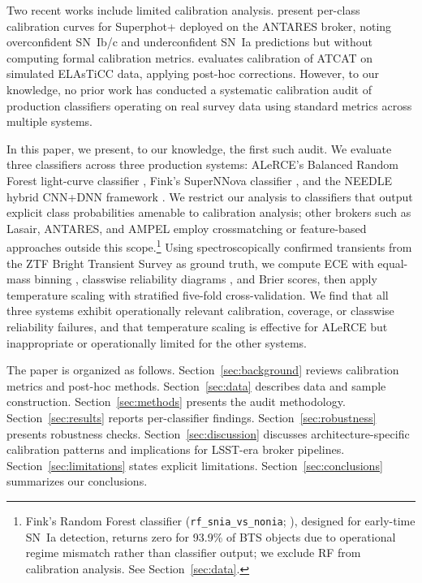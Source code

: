 \documentclass[twocolumn]{aastex631}
\begin{document}
Two recent works include limited calibration analysis.
\citet{desoto2024} present per-class calibration curves for Superphot+
deployed on the ANTARES broker, noting overconfident SN~Ib/c and
underconfident SN~Ia predictions but without computing formal calibration
metrics. \citet{tung2025} evaluates calibration of ATCAT on simulated
ELAsTiCC data, applying post-hoc corrections. However, to our knowledge,
no prior work has conducted a systematic calibration audit of production
classifiers operating on real survey data using standard metrics across
multiple systems.

In this paper, we present, to our knowledge, the first such audit.
We evaluate three classifiers across three production systems:
ALeRCE's Balanced Random Forest light-curve classifier
\citep[\texttt{lc\_classifier\_v1.1.13};][]{sanchezsaez2021},
Fink's SuperNNova classifier \citep{moller2020}, and the NEEDLE
hybrid CNN+DNN framework \citep{sheng2024}. We restrict our
analysis to classifiers that output explicit class probabilities
amenable to calibration analysis; other brokers such as Lasair,
ANTARES, and AMPEL employ crossmatching or feature-based approaches
outside this scope.\footnote{Fink's Random Forest classifier
(\texttt{rf\_snia\_vs\_nonia}; \citealt{leoni2022}), designed for
early-time SN~Ia detection, returns zero for 93.9\% of BTS objects
due to operational regime mismatch rather than classifier output;
we exclude RF from calibration analysis. See Section~\ref{sec:data}.}
Using spectroscopically confirmed transients from the ZTF Bright
Transient Survey \citep[BTS;][]{fremling2020, perley2020} as ground
truth, we compute ECE with equal-mass binning \citep{roelofs2022},
classwise reliability diagrams \citep{nixon2019}, and Brier scores,
then apply temperature scaling with stratified five-fold
cross-validation. We find that all three systems exhibit operationally relevant
calibration, coverage, or classwise reliability failures, and that
temperature scaling is effective for ALeRCE but inappropriate or
operationally limited for the other systems.

The paper is organized as follows. Section~\ref{sec:background}
reviews calibration metrics and post-hoc methods.
Section~\ref{sec:data} describes data and sample construction.
Section~\ref{sec:methods} presents the audit methodology.
Section~\ref{sec:results} reports per-classifier findings.
Section~\ref{sec:robustness} presents robustness checks.
Section~\ref{sec:discussion} discusses architecture-specific
calibration patterns and implications for LSST-era broker pipelines.
Section~\ref{sec:limitations} states explicit limitations.
Section~\ref{sec:conclusions} summarizes our conclusions.
\end{document}
